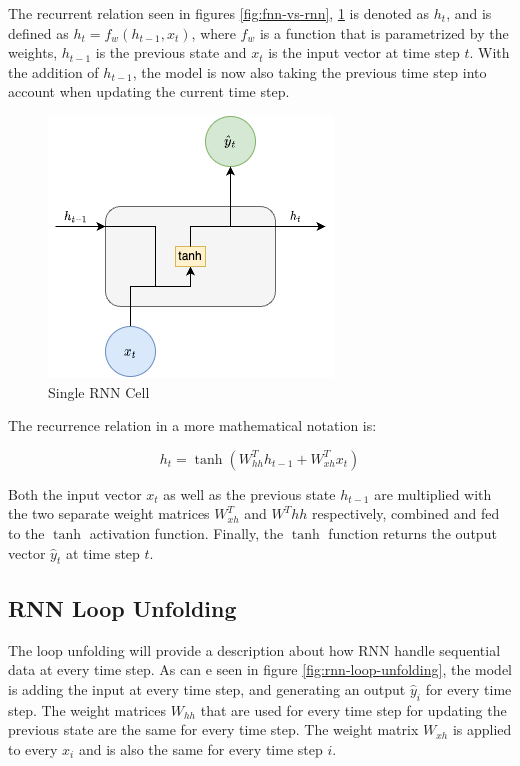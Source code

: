             The recurrent relation seen in figures \ref{fig:fnn-vs-rnn}, \ref{fig:single-rnn-cell} is denoted as $h_t$, and is defined as $h_t = f_w(h_{t - 1}, x_t)$, where $f_w$ is a function that is parametrized by the weights, $h_{t-1}$ is the previous state and $x_t$ is the input vector at time step $t$. With the addition of $h_{t-1}$, the model is now also taking the previous time step into account when updating the current time step. 
            \begin{figure}[h!]
                \centering
                \includegraphics[scale=0.5]{figures/single_rnn_cell.drawio.png}
                \caption{Single RNN Cell}
                \label{fig:single-rnn-cell}
            \end{figure}

            The recurrence relation in a more mathematical notation is:

            $$h_t = \tanh(W^T_{hh} h_{t-1} + W^T_{xh} x_t)$$
            
            Both the input vector $x_t$ as well as the previous state $h_{t-1}$ are multiplied with the two separate weight matrices $W^T_{xh}$ and $W^T{hh}$ respectively, combined and fed to the $\tanh$ activation function. Finally, the $\tanh$ function returns the output vector $\hat{y}_t$ at time step $t$.

        \subsection{RNN Loop Unfolding}
        \label{sec:rnn-loop-unfolding-background}

            The loop unfolding will provide a description about how RNN handle sequential data at every time step.
            As can  e seen in figure \ref{fig:rnn-loop-unfolding}, the model is adding the input at every time step, and generating an output $\hat{y}_i$ for every time step.
            The weight matrices $W_{hh}$ that are used for every time step for updating the previous state are the same for every time step.
            The weight matrix $W_{xh}$ is applied to every $x_i$ and is also the same for every time step $i$.

